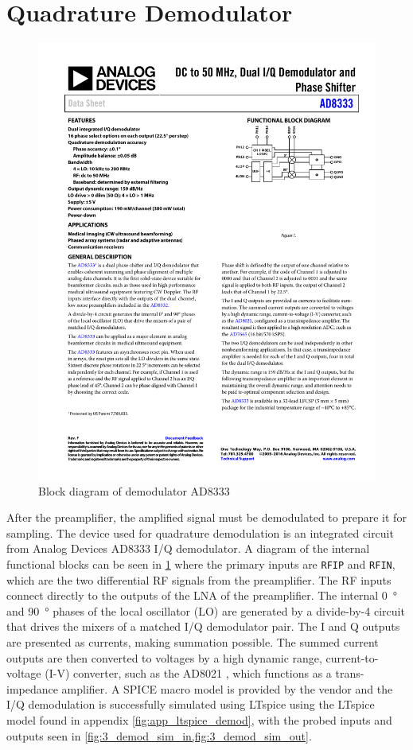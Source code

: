 \section{Quadrature Demodulator}
\begin{figure}[htbp]
	\centering
	\includegraphics[width=.8\textwidth]{Figures/3_ad8333_block.pdf}
	\caption[Block diagram of demodulator AD8333]{Block diagram of demodulator AD8333 \cite{AD8333}}
	\label{fig:3_demodulator_block}
\end{figure}
After the preamplifier, the amplified signal must be demodulated to prepare it for sampling. The device used for quadrature demodulation is an integrated circuit from Analog Devices AD8333 \cite{AD8333} I/Q demodulator. A diagram of the internal functional blocks can be seen in \cref{fig:3_demodulator_block} where the primary inputs are \texttt{RFIP} and \texttt{RFIN}, which are the two differential RF signals from the preamplifier. The RF inputs connect directly to the outputs of the LNA of the preamplifier. The internal \qty{0}{\degree} and \qty{90}{\degree} phases of the local oscillator (LO) are generated by a divide-by-4 circuit that drives the mixers of a matched I/Q demodulator pair. The I and Q outputs are presented as currents, making summation possible. The summed current outputs are then converted to voltages by a high dynamic range, current-to-voltage (I-V) converter, such as the AD8021 \cite{AD8021}, which functions as a trans-impedance amplifier. A SPICE macro model is provided by the vendor and the I/Q demodulation is successfully simulated using LTspice using the LTspice model found in appendix \cref{fig:app_ltspice_demod}, with the probed inputs and outputs seen in \cref{fig:3_demod_sim_in,fig:3_demod_sim_out}.

